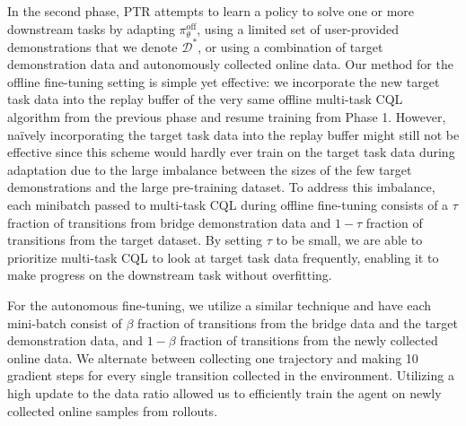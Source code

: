  In the second phase, PTR attempts to learn a policy to solve one or more downstream tasks by adapting $\pi^\text{off}_\theta$, using a limited set of user-provided demonstrations that we denote $\mathcal{D}^*$, or using a combination of target demonstration data and autonomously collected online data. Our method for the offline fine-tuning setting is simple yet effective: we incorporate the new target task data into the replay buffer of the very same offline multi-task CQL algorithm from the previous phase and resume training from Phase 1. However, na\"ively incorporating the target task data into the replay buffer might still not be effective since this scheme would hardly ever train on the target task data during adaptation due to the large imbalance between the sizes of the few target demonstrations and the large pre-training dataset. To address this imbalance, each minibatch passed to multi-task CQL during offline fine-tuning consists of a $\tau$ fraction of transitions from bridge demonstration data and $1 - \tau$ fraction of transitions from the target dataset. By setting $\tau$ to be small, we are able to prioritize multi-task CQL to look at target task data frequently, enabling it to make progress on the downstream task without overfitting.

For the autonomous fine-tuning, we utilize a similar technique and have each mini-batch consist of $\beta$ fraction of transitions from the bridge data and the target demonstration data, and $1 - \beta$ fraction of transitions from the newly collected online data. We alternate between collecting one trajectory and making 10 gradient steps for every single transition collected in the environment. Utilizing a high update to the data ratio allowed us to efficiently train the agent on newly collected online samples from rollouts.


